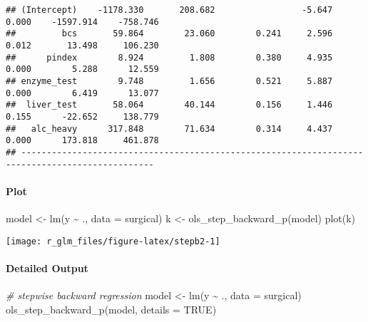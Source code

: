 \documentclass[
]{article}
\newenvironment{Shaded}{\begin{snugshade}}{\end{snugshade}}
\newcommand{\AttributeTok}[1]{\textcolor[rgb]{0.77,0.63,0.00}{#1}}
\newcommand{\CommentTok}[1]{\textcolor[rgb]{0.56,0.35,0.01}{\textit{#1}}}
\newcommand{\ConstantTok}[1]{\textcolor[rgb]{0.00,0.00,0.00}{#1}}
\newcommand{\FunctionTok}[1]{\textcolor[rgb]{0.00,0.00,0.00}{#1}}
\newcommand{\NormalTok}[1]{#1}
\newcommand{\OtherTok}[1]{\textcolor[rgb]{0.56,0.35,0.01}{#1}}
\newcommand{\SpecialCharTok}[1]{\textcolor[rgb]{0.00,0.00,0.00}{#1}}
\begin{document}
\begin{verbatim}
## (Intercept)    -1178.330       208.682                 -5.647    0.000    -1597.914    -758.746 
##         bcs       59.864        23.060        0.241     2.596    0.012       13.498     106.230 
##      pindex        8.924         1.808        0.380     4.935    0.000        5.288      12.559 
## enzyme_test        9.748         1.656        0.521     5.887    0.000        6.419      13.077 
##  liver_test       58.064        40.144        0.156     1.446    0.155      -22.652     138.779 
##   alc_heavy      317.848        71.634        0.314     4.437    0.000      173.818     461.878 
## ------------------------------------------------------------------------------------------------
\end{verbatim}

\hypertarget{plot-3}{%
\paragraph{Plot}\label{plot-3}}

\begin{Shaded}
\begin{Highlighting}[]
\NormalTok{model }\OtherTok{\textless{}{-}} \FunctionTok{lm}\NormalTok{(y }\SpecialCharTok{\textasciitilde{}}\NormalTok{ ., }\AttributeTok{data =}\NormalTok{ surgical)}
\NormalTok{k }\OtherTok{\textless{}{-}} \FunctionTok{ols\_step\_backward\_p}\NormalTok{(model)}
\FunctionTok{plot}\NormalTok{(k)}
\end{Highlighting}
\end{Shaded}

\begin{center}\texttt{[image: r\_glm\_files/figure-latex/stepb2-1]} \end{center}

\hypertarget{detailed-output-1}{%
\paragraph{Detailed Output}\label{detailed-output-1}}

\begin{Shaded}
\begin{Highlighting}[]
\CommentTok{\# stepwise backward regression}
\NormalTok{model }\OtherTok{\textless{}{-}} \FunctionTok{lm}\NormalTok{(y }\SpecialCharTok{\textasciitilde{}}\NormalTok{ ., }\AttributeTok{data =}\NormalTok{ surgical)}
\FunctionTok{ols\_step\_backward\_p}\NormalTok{(model, }\AttributeTok{details =} \ConstantTok{TRUE}\NormalTok{)}
\end{Highlighting}
\end{Shaded}
\end{document}
